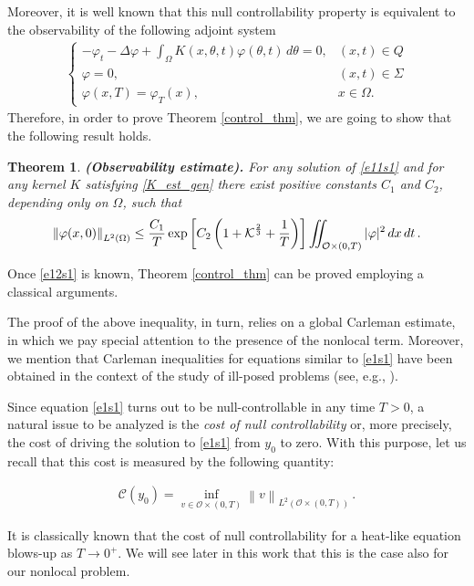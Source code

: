 \documentclass{amsart}    %
\newcommand{\D}{\displaystyle}
\newcommand{\norm}[2]{\left\|#1\right\|_{#2}}
\newcommand{\intd}{\displaystyle\int \kern -7pt \int}
\newtheorem{theorem}{\bf Theorem}[section]
\begin{document}
Moreover, it is well known that this null controllability property is equivalent to the observability of the following adjoint system
\begin{align}\label{e11s1}
	\begin{cases}
		\D-\varphi_t-\Delta\varphi + \int_\Omega K(x,\theta,t)\varphi(\theta,t)\,d\theta = 0, & (x,t)\in Q
		\\
		\varphi = 0, & (x,t)\in \Sigma
		\\
		\varphi(x,T) = \varphi_T(x), & x\in \Omega.
	\end{cases}
\end{align}
Therefore, in order to prove Theorem \ref{control_thm}, we are going to show that the following result holds.

\begin{theorem}\label{th2s1} {\bf(Observability estimate).}
	For any solution of \eqref{e11s1} and for any kernel $K$ satisfying \eqref{K_est_gen} there exist positive constants $C_1$ and $C_2$, depending only on $\Omega$, such that 
	\begin{align}\label{e12s1}
		\norm{\varphi(x,0)}{L^2(\Omega)} \leq \frac{C_1}{T} \exp\left[C_2\left(1 + \mathcal{K}^{\frac 23} +\frac
	1T \right)\right] \intd_{{ \mathcal O}\times(0,T)}|\varphi|^{2}\,dx\,dt\,.
	\end{align}
\end{theorem}
Once \eqref{e12s1} is known, Theorem \ref{control_thm} can be proved employing a classical arguments. 

The proof of the above inequality, in turn, relies on a global Carleman estimate, in which we pay special attention to the presence of the nonlocal term. Moreover, we mention that Carleman inequalities for equations similar to \eqref{e1s1} have been obtained in the context of the study of ill-posed problems (see, e.g., \cite{lorenzi2011two}). 

Since equation \eqref{e1s1} turns out to be null-controllable in any time $T>0$, a natural issue to be analyzed is the {\it cost of null controllability} or, more precisely, the cost of driving the solution to \eqref{e1s1} from $y_0$ to zero. With this purpose, let us recall that this cost is measured by the following quantity:

\begin{align}\label{cost}
	\mathcal C(y_0)=\D\inf_{v\in{\mathcal O\times(0,T)}}\norm{v}{L^2(\mathcal O\times(0,T))}\,.
\end{align}

It is classically known that the cost of null controllability for a heat-like equation blows-up as $T\to 0^+$. We will see later in this work that this is the case also for our nonlocal problem.
\end{document}
